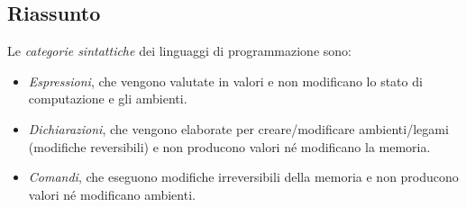 \documentclass[a4paper,oneside,titlepage]{book}
\begin{document}
\subsection{Riassunto}
Le \textit{categorie sintattiche} dei linguaggi di programmazione sono:
\begin{itemize}
	\item \textit{Espressioni}, che vengono valutate in valori e non modificano lo stato di computazione e gli ambienti.
	\item \textit{Dichiarazioni}, che vengono elaborate per creare/modificare ambienti/legami (modifiche reversibili) e non producono valori né modificano la memoria.
	\item \textit{Comandi}, che eseguono modifiche irreversibili della memoria e non producono valori né modificano ambienti.
\end{itemize}
\end{document}
